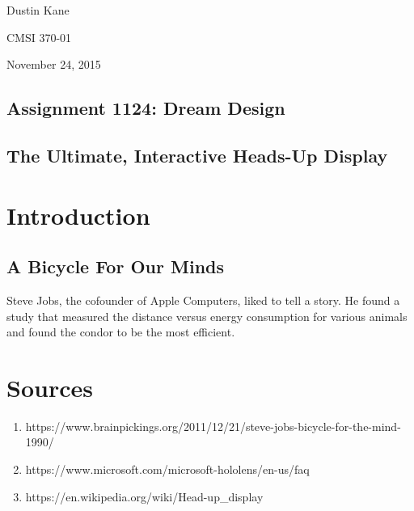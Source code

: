 \documentclass[a4paper,12pt]{article}
\begin{document}
Dustin Kane

CMSI 370-01

November 24, 2015

\begin{center}
\section*{Assignment 1124: Dream Design}
\subsection*{The Ultimate, Interactive Heads-Up Display}
\end{center}

\section{Introduction}
\subsection{A Bicycle For Our Minds}

Steve Jobs, the cofounder of Apple Computers, liked to tell a story. He found a study that measured the distance versus energy consumption for various animals and found the condor to be the most efficient. 

\section{Sources}

\begin{enumerate}
    \item https://www.brainpickings.org/2011/12/21/steve-jobs-bicycle-for-the-mind-1990/
	\item https://www.microsoft.com/microsoft-hololens/en-us/faq
	\item https://en.wikipedia.org/wiki/Head-up\_display
\end{enumerate}
\end{document}
